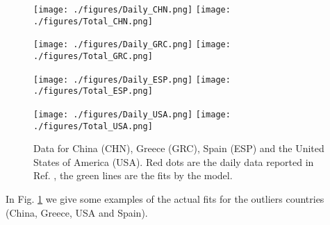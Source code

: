 \documentclass[aps,preprint]{revtex4}
\begin{document}
\begin{figure}[h]
\hspace{-0.04\textwidth}
\texttt{[image: ./figures/Daily\_CHN.png]}
\hspace{-0.04\textwidth}
\texttt{[image: ./figures/Total\_CHN.png]}

\hspace{-0.04\textwidth}
\texttt{[image: ./figures/Daily\_GRC.png]}
\hspace{-0.04\textwidth}
\texttt{[image: ./figures/Total\_GRC.png]}


\hspace{-0.04\textwidth}
\texttt{[image: ./figures/Daily\_ESP.png]}
\hspace{-0.04\textwidth}
\texttt{[image: ./figures/Total\_ESP.png]}


\hspace{-0.04\textwidth}
\texttt{[image: ./figures/Daily\_USA.png]}
\hspace{-0.04\textwidth}
\texttt{[image: ./figures/Total\_USA.png]}
\caption{
\small{
Data for China (CHN), Greece (GRC), Spain (ESP) and the United States of America (USA).
Red dots are the daily data reported in Ref. \cite{ECDC_source}, the green lines are the fits 
by the model.
}
}
\label{fig:data_outliers}
\end{figure}
In Fig. \ref{fig:data_outliers} we give some examples of the actual fits for the  
outliers countries (China, Greece, USA and Spain). 
\end{document}
